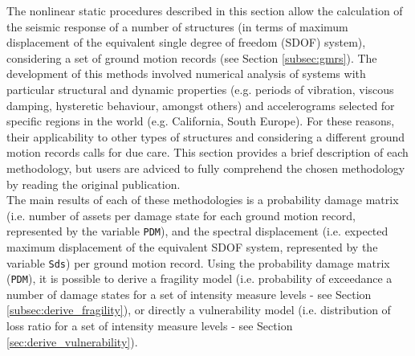 The nonlinear static procedures described in this section allow the calculation of the seismic response of a number of structures (in terms of maximum displacement of the equivalent single degree of freedom (SDOF) system), considering a set of ground motion records (see Section \ref{subsec:gmrs}). The development of this methods involved numerical analysis of systems with particular structural and dynamic properties (e.g. periods of vibration, viscous damping, hysteretic behaviour, amongst others) and accelerograms selected for specific regions in the world (e.g. California, South Europe). For these reasons, their applicability to other types of structures and considering a different ground motion records calls for due care. This section provides a brief description of each methodology, but users are adviced to fully comprehend the chosen methodology by reading the original publication. \\

The main results of each of these methodologies is a probability damage matrix (i.e. number of assets per damage state for each ground motion record, represented by the variable \verb=PDM=), and the spectral displacement (i.e. expected maximum displacement of the equivalent SDOF system, represented by the variable \verb=Sds=) per ground motion record. Using the probability damage matrix (\verb=PDM=), it is possible to derive a fragility model (i.e. probability of exceedance a number of damage states for a set of intensity measure levels - see Section \ref{subsec:derive_fragility}), or directly a vulnerability model (i.e. distribution of loss ratio for a set of intensity measure levels - see Section \ref{sec:derive_vulnerability}).